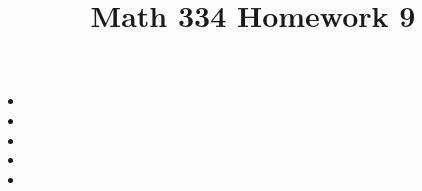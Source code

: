 \documentclass{article}
\title{Math 334 Homework 9}
\begin{document}
\maketitle
\begin{itemize}[label=]
	\item 
	\item 
	\item 
	\item 
	\item 
\end{itemize}
\end{document}

